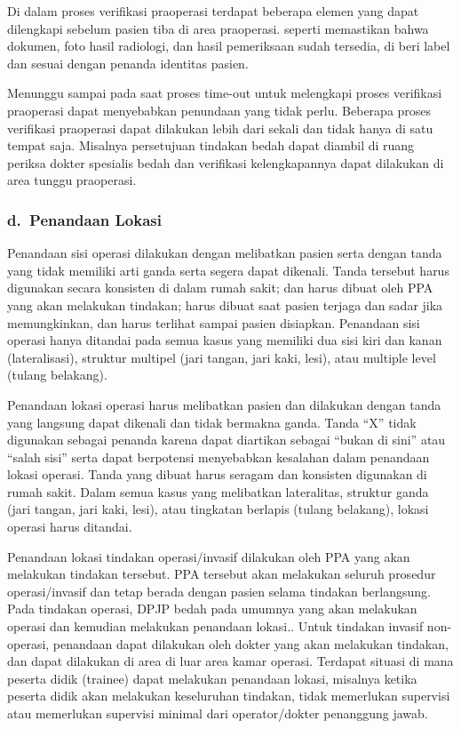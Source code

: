 \documentclass[
]{book}
\begin{document}
Di dalam proses verifikasi praoperasi terdapat beberapa elemen yang dapat dilengkapi sebelum pasien tiba di area praoperasi. seperti memastikan bahwa dokumen, foto hasil radiologi, dan hasil pemeriksaan sudah tersedia, di beri label dan sesuai dengan penanda identitas pasien.

Menunggu sampai pada saat proses time-out untuk melengkapi proses verifikasi praoperasi dapat menyebabkan penundaan yang tidak perlu. Beberapa proses verifikasi praoperasi dapat dilakukan lebih dari sekali dan tidak hanya di satu tempat saja. Misalnya persetujuan tindakan bedah dapat diambil di ruang periksa dokter spesialis bedah dan verifikasi kelengkapannya dapat dilakukan di area tunggu praoperasi.

\hypertarget{d.-penandaan-lokasi}{%
\subsubsection*{d.~Penandaan Lokasi}\label{d.-penandaan-lokasi}}

Penandaan sisi operasi dilakukan dengan melibatkan pasien serta dengan tanda yang tidak memiliki arti ganda serta segera dapat dikenali. Tanda tersebut harus digunakan secara konsisten di dalam rumah sakit; dan harus dibuat oleh PPA yang akan melakukan tindakan; harus dibuat saat pasien terjaga dan sadar jika memungkinkan, dan harus terlihat sampai pasien disiapkan. Penandaan sisi operasi hanya ditandai pada semua kasus yang memiliki dua sisi kiri dan kanan (lateralisasi), struktur multipel (jari tangan, jari kaki, lesi), atau multiple level (tulang belakang).

Penandaan lokasi operasi harus melibatkan pasien dan dilakukan dengan tanda yang langsung dapat dikenali dan tidak bermakna ganda. Tanda ``X'' tidak digunakan sebagai penanda karena dapat diartikan sebagai ``bukan di sini'' atau ``salah sisi'' serta dapat berpotensi menyebabkan kesalahan dalam penandaan lokasi operasi. Tanda yang dibuat harus seragam dan konsisten digunakan di rumah sakit. Dalam semua kasus yang melibatkan lateralitas, struktur ganda (jari tangan, jari kaki, lesi), atau tingkatan berlapis (tulang belakang), lokasi operasi harus ditandai.

Penandaan lokasi tindakan operasi/invasif dilakukan oleh PPA yang akan melakukan tindakan tersebut. PPA tersebut akan melakukan seluruh prosedur operasi/invasif dan tetap berada dengan pasien selama tindakan berlangsung. Pada tindakan operasi, DPJP bedah pada umumnya yang akan melakukan operasi dan kemudian melakukan penandaan lokasi.. Untuk tindakan invasif non-operasi, penandaan dapat dilakukan oleh dokter yang akan melakukan tindakan, dan dapat dilakukan di area di luar area kamar operasi. Terdapat situasi di mana peserta didik (trainee) dapat melakukan penandaan lokasi, misalnya ketika peserta didik akan melakukan keseluruhan tindakan, tidak memerlukan supervisi atau memerlukan supervisi minimal dari operator/dokter penanggung jawab.
\end{document}
